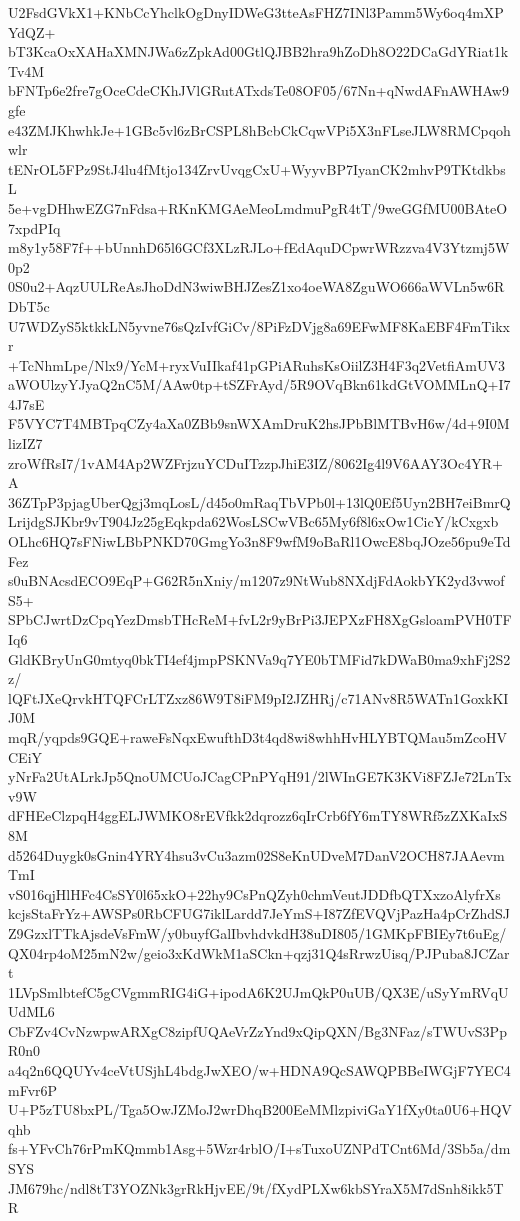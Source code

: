 U2FsdGVkX1+KNbCcYhclkOgDnyIDWeG3tteAsFHZ7INl3Pamm5Wy6oq4mXPYdQZ+
bT3KcaOxXAHaXMNJWa6zZpkAd00GtlQJBB2hra9hZoDh8O22DCaGdYRiat1kTv4M
bFNTp6e2fre7gOceCdeCKhJVlGRutATxdsTe08OF05/67Nn+qNwdAFnAWHAw9gfe
e43ZMJKhwhkJe+1GBc5vl6zBrCSPL8hBcbCkCqwVPi5X3nFLseJLW8RMCpqohwlr
tENrOL5FPz9StJ4lu4fMtjo134ZrvUvqgCxU+WyyvBP7IyanCK2mhvP9TKtdkbsL
5e+vgDHhwEZG7nFdsa+RKnKMGAeMeoLmdmuPgR4tT/9weGGfMU00BAteO7xpdPIq
m8y1y58F7f++bUnnhD65l6GCf3XLzRJLo+fEdAquDCpwrWRzzva4V3Ytzmj5W0p2
0S0u2+AqzUULReAsJhoDdN3wiwBHJZesZ1xo4oeWA8ZguWO666aWVLn5w6RDbT5c
U7WDZyS5ktkkLN5yvne76sQzIvfGiCv/8PiFzDVjg8a69EFwMF8KaEBF4FmTikxr
+TcNhmLpe/Nlx9/YcM+ryxVuIIkaf41pGPiARuhsKsOiilZ3H4F3q2VetfiAmUV3
aWOUlzyYJyaQ2nC5M/AAw0tp+tSZFrAyd/5R9OVqBkn61kdGtVOMMLnQ+I74J7sE
F5VYC7T4MBTpqCZy4aXa0ZBb9snWXAmDruK2hsJPbBlMTBvH6w/4d+9I0MlizIZ7
zroWfRsI7/1vAM4Ap2WZFrjzuYCDuITzzpJhiE3IZ/8062Ig4l9V6AAY3Oc4YR+A
36ZTpP3pjagUberQgj3mqLosL/d45o0mRaqTbVPb0l+13lQ0Ef5Uyn2BH7eiBmrQ
LrijdgSJKbr9vT904Jz25gEqkpda62WosLSCwVBc65My6f8l6xOw1CicY/kCxgxb
OLhc6HQ7sFNiwLBbPNKD70GmgYo3n8F9wfM9oBaRl1OwcE8bqJOze56pu9eTdFez
s0uBNAcsdECO9EqP+G62R5nXniy/m1207z9NtWub8NXdjFdAokbYK2yd3vwofS5+
SPbCJwrtDzCpqYezDmsbTHcReM+fvL2r9yBrPi3JEPXzFH8XgGsloamPVH0TFIq6
GldKBryUnG0mtyq0bkTI4ef4jmpPSKNVa9q7YE0bTMFid7kDWaB0ma9xhFj2S2z/
lQFtJXeQrvkHTQFCrLTZxz86W9T8iFM9pI2JZHRj/c71ANv8R5WATn1GoxkKIJ0M
mqR/yqpds9GQE+raweFsNqxEwufthD3t4qd8wi8whhHvHLYBTQMau5mZcoHVCEiY
yNrFa2UtALrkJp5QnoUMCUoJCagCPnPYqH91/2lWInGE7K3KVi8FZJe72LnTxv9W
dFHEeClzpqH4ggELJWMKO8rEVfkk2dqrozz6qIrCrb6fY6mTY8WRf5zZXKaIxS8M
d5264Duygk0sGnin4YRY4hsu3vCu3azm02S8eKnUDveM7DanV2OCH87JAAevmTmI
vS016qjHlHFc4CsSY0l65xkO+22hy9CsPnQZyh0chmVeutJDDfbQTXxzoAlyfrXs
kcjsStaFrYz+AWSPs0RbCFUG7iklLardd7JeYmS+I87ZfEVQVjPazHa4pCrZhdSJ
Z9GzxlTTkAjsdeVsFmW/y0buyfGalIbvhdvkdH38uDI805/1GMKpFBIEy7t6uEg/
QX04rp4oM25mN2w/geio3xKdWkM1aSCkn+qzj31Q4sRrwzUisq/PJPuba8JCZart
1LVpSmlbtefC5gCVgmmRIG4iG+ipodA6K2UJmQkP0uUB/QX3E/uSyYmRVqUUdML6
CbFZv4CvNzwpwARXgC8zipfUQAeVrZzYnd9xQipQXN/Bg3NFaz/sTWUvS3PpR0n0
a4q2n6QQUYv4ceVtUSjhL4bdgJwXEO/w+HDNA9QcSAWQPBBeIWGjF7YEC4mFvr6P
U+P5zTU8bxPL/Tga5OwJZMoJ2wrDhqB200EeMMlzpiviGaY1fXy0ta0U6+HQVqhb
fs+YFvCh76rPmKQmmb1Asg+5Wzr4rblO/I+sTuxoUZNPdTCnt6Md/3Sb5a/dmSYS
JM679hc/ndl8tT3YOZNk3grRkHjvEE/9t/fXydPLXw6kbSYraX5M7dSnh8ikk5TR
